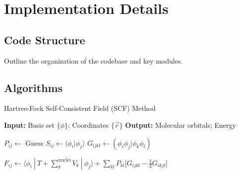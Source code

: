 \documentclass[12pt]{article}
\begin{document}
\section{Implementation Details}

\subsection{Code Structure}
Outline the organization of the codebase and key modules.

\subsection{Algorithms}

\begin{algorithm}
\caption{Hartree-Fock Self-Consistent Field (SCF) Method}
\begin{algorithmic}[1]

\Statex \textbf{Input:} Basis set $\{\phi\}$; Coordinates $\{\vec{r}\}$
\Statex \textbf{Output:} Molecular orbitals; Energy

\State $P_{ij} \gets $ Guess
\State $S_{ij} \gets \langle \phi_i | \phi_j \rangle$ 
\State $G_{ijkl} \gets (\phi_i\phi_j|\phi_k\phi_l)$ 

    \State $F_{ij} \gets \langle \phi_i \: | \: T + \sum_k^{\text{nuclei}}V_k \: |\: \phi_j \rangle + \sum_{kl} P_{kl} \Big[ G_{ijkl} - \frac{1}{2} G_{ikjl} \Big]$

\EndWhile


\end{algorithmic}
\end{algorithm}
\end{document}

